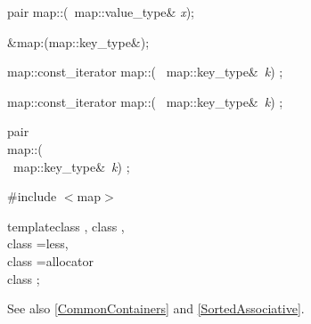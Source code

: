 \begin{multicols}{4}
pair\newline
map::(\const\ map::value_type\& \emph{x});

\T\&\quad map:\StrongClrBf{\indop}(\const map::key_type\&);


map::const_iterator\newline
map::(\newline
\phantom{map}\const\ map::key_type\&\ \emph{k}) \const;

map::const_iterator \newline
map::(\newline
\phantom{map}\const\ map::key_type\&\ \emph{k}) \const;

pair \\
map::(\\
\phantom{map::}\const\ map::key_type\&\ \emph{k}) \const;

{}
\symrunout\quad
{\ttfamily}


 \label{Multimap}

\#include $<$map$>$

\begin{templdec}
template\<class \Key, class \T,\\
\phantom{template$<$}class \Compare=less\TP{\Key},\\
\phantom{template$<$}class \Alloc=allocator\>\\
class ;\\
\end{templdec}

See also \ref{CommonContainers} and \ref{SortedAssociative}.


\end{multicols}
